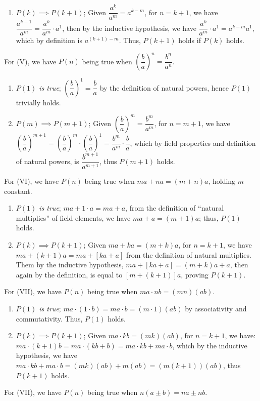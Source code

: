 \documentclass[12pt]{book}
\theoremstyle{definition}
\begin{document}
\begin{sol}
\begin{enumerate}[label = (\roman*)]
	\item $P(k)\implies P(k+1)$; Given $\dfrac{a^k}{a^m}=a^{k-m}$, for $n=k+1$, we have $\dfrac{a^{k+1}}{a^m}=\dfrac{a^k}{a^m}\cdot a^1$, then by the inductive hypothesis, we have $\dfrac{a^k}{a^m}\cdot a^1 = a^{k-m}a^1$, which by definition is $a^{(k+1)-m}$. Thus, $P(k+1)$ holds if $P(k)$ holds.
\end{enumerate}
For (V), we have $P(n)$ being true when $\left(\dfrac{b}{a}\right)^n = \dfrac{b^n}{a^n}$.
\begin{enumerate}[label = (\roman*)]
	\item \textit{$P(1)$ is true}; $\left(\dfrac{b}{a}\right)^1 = \dfrac{b}{a}$ by the definition of natural powers, hence $P(1)$ trivially holds. 
	\item $P(m)\implies P(m+1)$; Given $\left(\dfrac{b}{a}\right)^m = \dfrac{b^m}{a^m}$, for $n=m+1$, we have $\left(\dfrac{b}{a}\right)^{m+1}= \left(\dfrac{b}{a}\right)^m \cdot \left(\dfrac{b}{a}\right)^1 = \dfrac{b^m}{a^m} \cdot \dfrac{b}{a}$, which by field properties and definition of natural powers, is $\dfrac{b^{m+1}}{a^{m+1}}$, thus $P(m+1)$ holds.
\end{enumerate}
For (VI), we have $P(n)$ being true when $ma+na=(m+n)a$, holding $m$ constant.
\begin{enumerate}[label = (\roman*)]
	\item \textit{$P(1)$ is true}; $ma+1\cdot a=ma+a$, from the definition of ``natural multiplies'' of field elements, we have $ma+a=(m+1)a$; thus, $P(1)$ holds. 
	\item $P(k)\implies P(k+1)$; Given $ma+ka = (m+k)a$, for $n=k+1$, we have $ma+(k+1)a = ma+[ka+a]$ from the definition of natural multiplies. Them by the inductive hypothesis, $ma+[ka+a] = (m+k)a +a$, then again by the definition, is equal to $[m+(k+1)]a$, proving $P(k+1)$.
\end{enumerate}
For (VII), we have $P(n)$ being true when $ma\cdot nb =(mn)(ab)$.
\begin{enumerate}[label = (\roman*)]
	\item \textit{$P(1)$ is true}; $ma \cdot (1\cdot b)=ma\cdot b = (m \cdot 1)(ab)$ by associativity and commutativity. Thus, $P(1)$ holds.
	\item $P(k)\implies P(k+1)$; Given $ma\cdot kb = (mk)(ab)$, for $n=k+1$, we have: $ma\cdot (k+1)b=ma\cdot (kb+b) = ma\cdot kb + ma\cdot b$, which by the inductive hypothesis, we have $ma\cdot kb +ma\cdot b=(mk)(ab)+m(ab)=(m(k+1))(ab)$, thus $P(k+1)$ holds.
\end{enumerate}
For (VII), we have $P(n)$ being true when $n(a\pm b) = na\pm nb$.

\end{sol}
\end{document}
